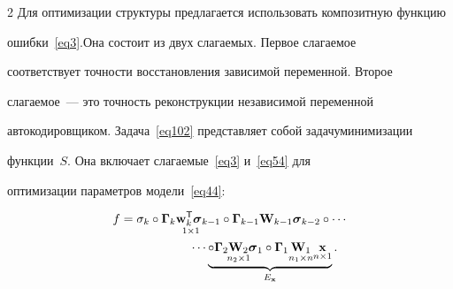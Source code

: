 \begin{multicols}{2}
Для оптимизации структуры предлагается использовать композитную функцию 


ошибки~\eqref{eq3}.\linebreak Она состоит из двух слагаемых. Первое слагаемое 


соответствует точности восстановления зависимой переменной. Второе 


слагаемое~--- это точность реконструкции независимой переменной 


автокодировщиком. Задача~\eqref{eq102} представляет собой задачу\linebreak минимизации 


функции~$S$. Она включает сла\-га\-емые~\eqref{eq3} и~\eqref{eq54} для 


оптимизации параметров модели~\eqref{eq44}:





\noindent


\begin{multline}


f =






\sigma_k\circ\underset{1\times1}


{\boldsymbol\Gamma_k\wm_k^\mathsf{T}\sigmab_{k-1}}\circ\boldsymbol\Gamma_{k-1}


\mathbf{W}_{k-1}\sigmab_{k-2}\circ\cdots\\


\hspace*{20mm}\cdots


\underbrace{\circ\underset{n_2 


\times 


1}{\boldsymbol\Gamma_2\mathbf{W}_2\sigmab_1}\circ\boldsymbol\Gamma_1\underset


{n_1 \times n}{\mathbf{W}_1}\underset{n \times 1}{\x}}_{E_\mathbf{x}}.


\label{eq58}


\end{multline}





\vspace*{-36pt}







$$



\end{multicols}
